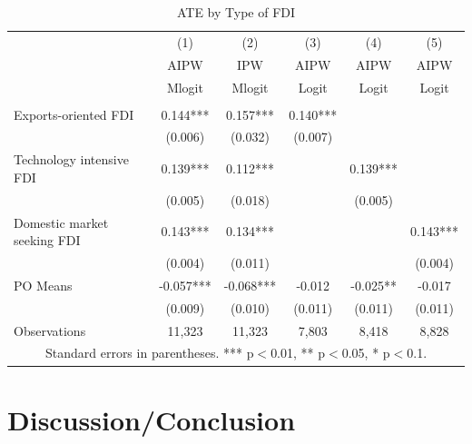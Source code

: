 \documentclass[a4paper,11pt]{scrartcl}
\newcommand{\comment}[1]{}
\begin{document}
\begin{table}[htbp]
	\centering
	\caption{ATE by Type of FDI}
	\label{tab:bytype}
\begin{threeparttable}

\begin{tabular}{lccccc} 
		\hline
		\hline
 	& (1) & (2) & (3) & (4) & (5) \\
	& AIPW & IPW  & AIPW  & AIPW & AIPW \\ 
	& Mlogit & Mlogit &Logit &Logit &Logit\\
		\hline
 			&  &  &  &  &   \\
Exports-oriented FDI 	& 0.144*** &   0.157*** & 0.140*** &  &  \\
 						& (0.006) &   (0.032) & (0.007) &  &\\
Technology intensive FDI & 0.139***   & 0.112*** &  & 0.139*** &   \\
 						 & (0.005)  & (0.018) &  &  (0.005)&  \\
Domestic market seeking FDI & 0.143*** &   0.134*** &  &  &0.143*** \\
 							& (0.004)   & (0.011) &  &  & (0.004)  \\
PO Means 		&   -0.057*** &   -0.068*** &-0.012  &-0.025**  & -0.017    \\
 				&   (0.009) &   (0.010) &  (0.011)&(0.011)  & (0.011) \\
Observations 	& 11,323  & 11,323 &  7,803  & 8,418 & 8,828  \\ 
		\hline
		\hline
	\multicolumn{6}{c}{\footnotesize{Standard errors in parentheses. *** p$<$0.01, ** p$<$0.05, * p$<$0.1. }}
\end{tabular}

\end{threeparttable}
\end{table}


\section{Discussion/Conclusion}

\comment{
For citation: \\
you have to add your reference firstly in bibCG. After having done so you can always include the reference in the actual file as follows: \\
 \citet{aitken99}\\
\citep[p.~35]{CaliendoHujerThomsen2008}	}
\end{document}
